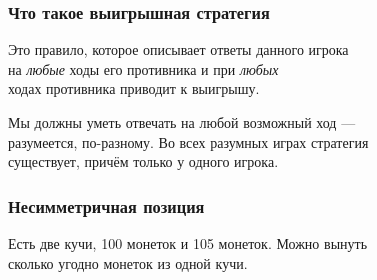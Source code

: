 \begin{frame} \frametitle{Что такое выигрышная стратегия}
	Это правило, которое описывает ответы данного игрока \\
	на {\it любые} ходы его противника и при {\it любых} \\
	ходах противника приводит к выигрышу. \bigskip
	
	Мы должны уметь отвечать на любой возможный ход — \\
	разумеется, по-разному. Во всех разумных играх стратегия \\
	существует, причём только у одного игрока.
\end{frame}

\begin{frame} \frametitle{Несимметричная позиция}
	Есть две кучи, 100 монеток и 105 монеток. Можно вынуть \\
	сколько угодно монеток из одной кучи.
	\medskip \pause

\begin{center}  \end{center}
\end{frame}